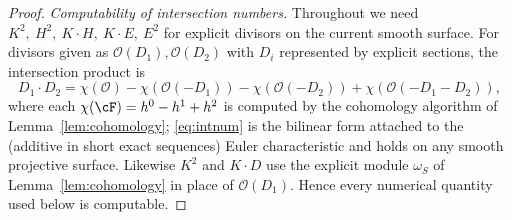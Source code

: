 \documentclass{amsart}
\theoremstyle{plain}
\theoremstyle{definition}
\newcommand{\cO}{\mathcal{O}}
\begin{document}
\begin{proof}
\emph{Computability of intersection numbers.}  Throughout we need
$K^2,\ H^2,\ K\cdot H,\ K\cdot E,\ E^2$ for explicit divisors on the current
smooth surface.  For divisors given as $\cO(D_1),\cO(D_2)$ with $D_i$ represented
by explicit sections, the intersection product is
\begin{equation}\label{eq:intnum}
D_1\cdot D_2=\chi(\cO)-\chi(\cO(-D_1))-\chi(\cO(-D_2))+\chi(\cO(-D_1-D_2)),
\end{equation}
where each $\chi(\cF)=h^0-h^1+h^2$ is computed by the cohomology algorithm of
Lemma~\ref{lem:cohomology}; \eqref{eq:intnum} is the bilinear form attached to
the (additive in short exact sequences) Euler characteristic and holds on any
smooth projective surface.  Likewise $K^2$ and $K\cdot D$ use the explicit module
$\omega_S$ of Lemma~\ref{lem:cohomology} in place of $\cO(D_1)$.  Hence every
numerical quantity used below is computable.


\end{proof}
\end{document}
